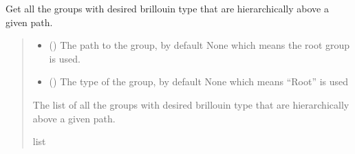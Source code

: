 \documentclass[letterpaper,10pt,english]{sphinxmanual}
\begin{document}
\begin{fulllineitems}
\begin{fulllineitems}
\begin{quote}
\begin{description}
\end{description}\end{quote}

\end{fulllineitems}


\begin{fulllineitems}
\label{\detokenize{_autosummary/HDF5_BLS.wrapper:HDF5_BLS.wrapper.Wrapper.get_special_groups_hierarchy}}
\pysigstartsignatures
\pysiglinewithargsret
{}
{\sphinxparamcomma {}}
{}
\pysigstopsignatures
\sphinxAtStartPar
Get all the groups with desired brillouin type that are hierarchically above a given path.
\begin{quote}\begin{description}
\begin{itemize}
\item {} 
\sphinxAtStartPar
{} (\sphinxstyleliteralemphasis{\sphinxupquote{, }}) \textendash{} The path to the group, by default None which means the root group is used.

\item {} 
\sphinxAtStartPar
{} (\sphinxstyleliteralemphasis{\sphinxupquote{, }}) \textendash{} The type of the group, by default None which means “Root” is used

\end{itemize}

\sphinxAtStartPar
The list of all the groups with desired brillouin type that are hierarchically above a given path.

\sphinxAtStartPar
list

\end{description}\end{quote}

\end{fulllineitems}


\end{fulllineitems}
\end{document}
